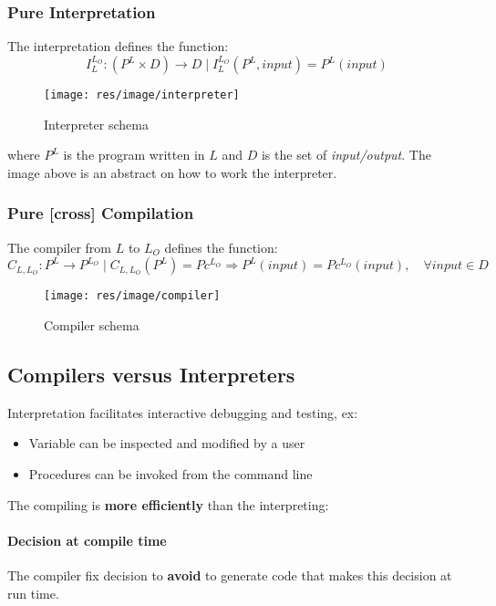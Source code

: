 \subsubsection{Pure Interpretation}
The interpretation defines the function:
$$I^{L_O}_L : (P^L \times D) \to D \mid I^{L_O}_L(P^L, input) =
P^L(input)$$

\begin{figure}[H]
\begin{center}
\texttt{[image: res/image/interpreter]}
\caption{Interpreter schema}
\label{fig:interpreter_schema}
\end{center}
\end{figure}

where $P^L$ is the program written in $L$ and $D$ is the set of
\textit{input/output}. The image above is an abstract on how to work the
interpreter.

\subsubsection{Pure [cross] Compilation}
The compiler from $L$ to $L_O$ defines the function:
$$C_{L,L_O}: P^L \to P^{L_O} \mid C_{L,L_O}(P^L) = Pc^{L_O} \Rightarrow
P^L(input) = Pc^{L_O}(input), \quad \forall input \in D$$

\begin{figure}[ht]
\begin{center}
\texttt{[image: res/image/compiler]}
\caption{Compiler schema}
\label{fig:compiler_schema}
\end{center}
\end{figure}

\subsection{Compilers versus Interpreters}
Interpretation facilitates interactive debugging and testing, ex:
\begin{itemize}
\item Variable can be inspected and modified by a user
\item Procedures can be invoked from the command line
\end{itemize}

The compiling is \textbf{more efficiently} than the interpreting:

\paragraph{Decision at compile time}
The compiler fix decision to \textbf{avoid} to generate code that makes this
decision at run time.


